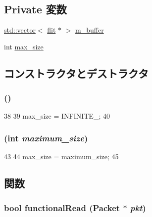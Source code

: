 \subsection*{Private 変数}
\begin{DoxyCompactItemize}
\item 
\hyperlink{classstd_1_1vector}{std::vector}$<$ \hyperlink{classflit}{flit} $\ast$ $>$ \hyperlink{classflitBuffer_a7a3921685941f05d65ce9ec45a63f6d1}{m\_\-buffer}
\item 
int \hyperlink{classflitBuffer_a98ca8117bc73d9d7520727c4ce8772e6}{max\_\-size}
\end{DoxyCompactItemize}


\subsection{コンストラクタとデストラクタ}
\hypertarget{classflitBuffer_a2b1bb33c8148b87e9c088503ce752b0a}{
\subsubsection[{flitBuffer}]{ ()}}
\label{classflitBuffer_a2b1bb33c8148b87e9c088503ce752b0a}



\begin{DoxyCode}
38 {
39     max_size = INFINITE_;
40 }
\end{DoxyCode}
\hypertarget{classflitBuffer_a2e743ce8c662b9e44db2698126c80a4e}{
\subsubsection[{flitBuffer}]{ (int {\em maximum\_\-size})}}
\label{classflitBuffer_a2e743ce8c662b9e44db2698126c80a4e}



\begin{DoxyCode}
43 {
44     max_size = maximum_size;
45 }
\end{DoxyCode}


\subsection{関数}
\hypertarget{classflitBuffer_a6db56c593ee28a561c47e75a859300dd}{
\subsubsection[{functionalRead}]{\setlength{\rightskip}{0pt plus 5cm}bool functionalRead ({\bf Packet} $\ast$ {\em pkt})}}
\label{classflitBuffer_a6db56c593ee28a561c47e75a859300dd}




